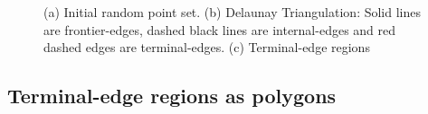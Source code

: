 \documentclass[pdflatex,sn-mathphys]{sn-jnl}%
\theoremstyle{thmstyleone}%
\theoremstyle{thmstyletwo}%
\theoremstyle{thmstylethree}%
\begin{document}
\begin{figure}[h]
\centering     %
{} 
\caption{(a) Initial random point set. (b) Delaunay Triangulation: Solid lines are frontier-edges, dashed black lines are internal-edges and red dashed edges are terminal-edges. (c) Terminal-edge regions}
\label{fig:general_example} 
\end{figure}



\subsection{Terminal-edge regions as  polygons}

\end{document}
